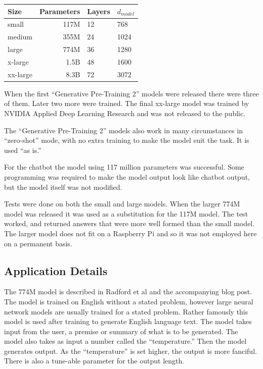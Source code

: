 \begin{center}

\begin{tabular}{lrll}
	Size & Parameters & Layers & $d_{model}$ \\
	\hline
	small & 117M       & 12     & 768          \\
	medium & 355M       & 24     & 1024         \\
	large & 774M       & 36     & 1280         \\
	x-large & 1.5B     & 48     & 1600 \\
	xx-large & 8.3B   &  72 &   3072 
\end{tabular}

	
\end{center}

When the first ``Generative Pre-Training 2'' models were released there were three of them. Later two more were trained. The final xx-large model was trained by NVIDIA Applied Deep Learning Research \cite{2019NVIDIAadlr} and was not released to the public.

The ``Generative Pre-Training 2'' models also work in many circumstances in ``zero-shot'' mode, with no extra training to make the model suit the task. It is used ``as is.''

For the chatbot the model using 117 million parameters was successful. Some programming was required to make the model output look like chatbot output, but the model itself was not modified.

Tests were done on both the small and large models. When the larger 774M model was released it was used as a substitution for the 117M model. The test worked, and returned answers that were more well formed than the small model. The larger model does not fit on a Raspberry Pi and so it was not employed here on a permanent basis. %

\subsection{Application Details}
The 774M model is described in Radford et al \cite{radford2019language} and the accompanying blog post. The model is trained on English without a stated problem, however large neural network models are usually trained for a stated problem. Rather famously this model is used after training to generate English language text. The model takes input from the user, a premise or summary of what is to be generated. The model also takes as input a number called the ``temperature.'' Then the model generates output. As the ``temperature'' is set higher, the output is more fanciful. There is also a tune-able parameter for the output length. 

